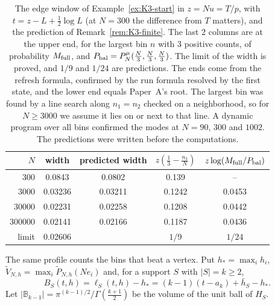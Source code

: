 \begin{table}[t]
\centering\small
\begin{tabular}{@{}rcccc@{}}
\toprule
$N$ & width & predicted width & $z(\frac13-\frac{n_3}N)$ &
$z\log(M_{\rm full}/P_{\rm bal})$\\
\midrule
300 & 0.0843 & 0.0802 & 0.139 & --\\
3000 & 0.03236 & 0.03211 & 0.1242 & 0.0453\\
30000 & 0.02231 & 0.02258 & 0.1208 & 0.0442\\
300000 & 0.02141 & 0.02166 & 0.1187 & 0.0436\\
limit & 0.02606 & & $1/9$ & $1/24$\\
\bottomrule
\end{tabular}
\caption{The edge window of Example~\ref{ex:K3-start} in $z=Nu=T/p$, with
$t=z-L+\frac12\log L$ (at $N=300$ the difference from $T$ matters), and the
prediction of Remark~\ref{rem:K3-finite}. The last 2 columns are at the upper
end, for the largest bin $n$ with 3 positive counts, of probability
$M_{\rm full}$, and $P_{\rm bal}=P^\mu_N(\frac N3,\frac N3,\frac N3)$. The limit
of the width is proved, and $1/9$ and $1/24$ are predictions. The ends come from
the refresh formula, confirmed by the run formula resolved by the first state,
and the lower end equals Paper~A's root. The largest bin was found by a line
search along $n_1=n_2$ checked on a neighborhood, so for $N\ge3000$ we assume it
lies on or next to that line. A dynamic program over all bins confirmed the
modes at $N=90$, $300$ and $1002$. The predictions were written before the
computations.}
\label{tab:K3-window}
\end{table}

The same profile counts the bins that beat a vertex. Put $h_*=\max_ih_i$,
$\widetilde V_{N,h}=\max_i\widetilde P_{N,h}(Ne_i)$ and, for a support $S$ with
$|S|=k\ge2$,
\[
 B_S(t,h)=\ell_S(t,h)-h_*=(k-1)(t-a_k)+\bar h_S-h_*.
\]
Let $|\mathbb B_{k-1}|=\pi^{(k-1)/2}/\Gamma(\frac{k+1}2)$ be the volume of the
unit ball of $H_S$.

